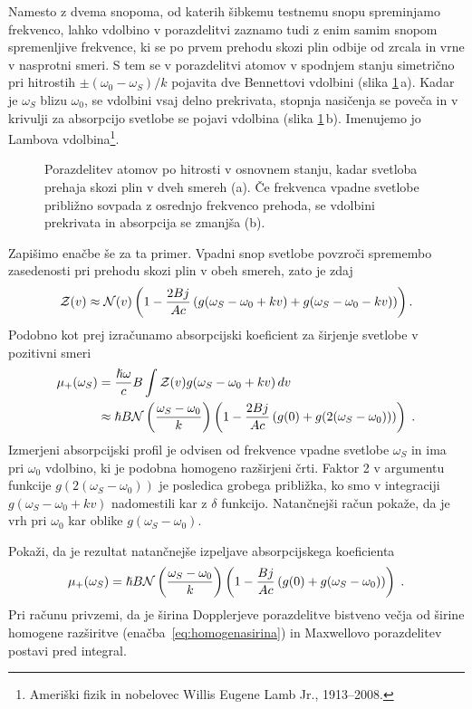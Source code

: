 Namesto z dvema snopoma, od katerih šibkemu testnemu snopu spreminjamo
frekvenco, lahko vdolbino v porazdelitvi zaznamo tudi z enim samim snopom
spremenljive frekvence, ki se po prvem prehodu skozi plin odbije od
zrcala in vrne v nasprotni smeri. S tem se v porazdelitvi atomov
v spodnjem stanju simetrično pri hitrostih $\pm(\omega_{0}-\omega_S)/k$
pojavita dve Bennettovi vdolbini (slika \ref{fig:Lamb}\,a).
Kadar je $\omega_S$ blizu $\omega_{0}$, se vdolbini vsaj delno prekrivata, 
stopnja nasičenja se poveča in v krivulji za absorpcijo svetlobe se pojavi 
vdolbina (slika \ref{fig:Lamb}\,b).
Imenujemo jo Lambova vdolbina\footnote{Ameriški fizik in nobelovec 
Willis Eugene Lamb Jr., 1913--2008.}. 
\begin{figure}[h]
\centering
\def\svgwidth{140truemm} 

\caption{Porazdelitev atomov po hitrosti v osnovnem stanju, kadar svetloba prehaja 
skozi plin v dveh smereh (a). Če frekvenca vpadne svetlobe približno sovpada z osrednjo
frekvenco prehoda, se vdolbini prekrivata in absorpcija se zmanjša (b).}
\label{fig:Lamb}
\end{figure}

Zapišimo enačbe še za ta primer. Vpadni snop svetlobe povzroči spremembo zasedenosti
pri prehodu skozi plin v obeh smereh, zato je zdaj 
\begin{equation}
{\cal Z}(v)\approx{\cal N}(v)\left(1-\frac{2Bj}{Ac}\left(g(\omega_S-\omega_{0}+kv)+
g(\omega_S-\omega_{0}-kv)\right)\right).
\label{4.92}
\end{equation}
Podobno kot prej izračunamo absorpcijski koeficient za širjenje svetlobe v
pozitivni smeri 
\begin{align}
\mu_{+}(\omega_S) & =  \frac{\hslash\omega}{c}B\int{\cal Z}(v)g(\omega_S-\omega_{0}+kv)\, dv\nonumber \\
 & \approx  \hslash B{\cal N}\left(\frac{\omega_S-\omega_0}{k}\right)\left(1-\frac{2Bj}
 {Ac}\left(g(0)+g(2(\omega_S-\omega_{0}))\right)\right)\;.
 \label{eq:lamb}
\end{align}
Izmerjeni absorpcijski profil je odvisen od frekvence vpadne svetlobe $\omega_S$ in ima pri $\omega_0$ vdolbino,
ki je podobna homogeno razširjeni črti. Faktor 2 v argumentu
funkcije $g(2(\omega_S-\omega_{0}))$ je posledica  grobega približka,
ko smo v integraciji $g(\omega_S-\omega_{0}+kv)$ nadomestili kar z
$\delta$ funkcijo. Natančnejši račun pokaže, da je vrh pri $\omega_{0}$
kar oblike $g(\omega_S-\omega_{0})$.

\begin{definition}
Pokaži, da je rezultat natančnejše izpeljave absorpcijskega koeficienta  
\begin{equation}
 \mu_{+}(\omega_S) = \hslash B{\cal N}\left(\frac{\omega_S-\omega_0}{k}\right)\left(1-\frac{Bj}
 {Ac}\left(g(0)+g(\omega_S-\omega_{0})\right)\right)\;.
\end{equation}
Pri računu privzemi, da je širina Dopplerjeve porazdelitve bistveno večja od širine homogene
razširitve (enačba~\ref{eq:homogenasirina}) in Maxwellovo porazdelitev postavi pred integral. 
\end{definition}

